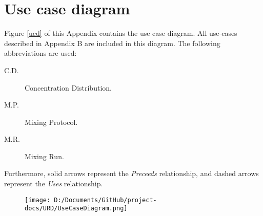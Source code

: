 \chapter{Use case diagram}

Figure \ref{ucd} of this Appendix contains the use case diagram. All use-cases described in Appendix B are included in this diagram. The following abbreviations are used:
\begin{description}
\item[C.D.] Concentration Distribution.
\item[M.P.] Mixing Protocol.
\item[M.R.] Mixing Run.
\end{description}

Furthermore, solid arrows represent the \emph{Preceeds} relationship, and dashed arrows represent the \emph{Uses} relationship.

\begin{figure}[h!]
\begin{center}
\texttt{[image: D:/Documents/GitHub/project-docs/URD/UseCaseDiagram.png]}
\end{center}
\end{figure}
